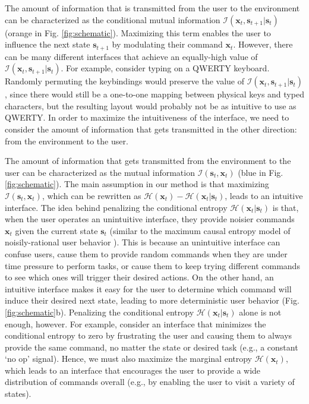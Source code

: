 \documentclass{article}
\newcommand{\bx}{\mathbf{x}}
\newcommand{\bs}{\mathbf{s}}
\newcommand{\mi}{\mathcal{I}}
\newcommand{\ent}{\mathcal{H}}
\begin{document}
The amount of information that is transmitted from the user to the environment can be characterized as the conditional mutual information $\mi(\bx_t, \bs_{t+1} | \bs_t)$ (orange in Fig. \ref{fig:schematic}).
Maximizing this term enables the user to influence the next state $\bs_{t+1}$ by modulating their command $\bx_t$.
However, there can be many different interfaces that achieve an equally-high value of $\mi(\bx_t, \bs_{t+1} | \bs_t)$.
For example, consider typing on a QWERTY keyboard.
Randomly permuting the keybindings would preserve the value of $\mi(\bx_t, \bs_{t+1} | \bs_t)$, since there would still be a one-to-one mapping between physical keys and typed characters, but the resulting layout would probably not be as intuitive to use as QWERTY.
In order to maximize the intuitiveness of the interface, we need to consider the amount of information that gets transmitted in the other direction: from the environment to the user.

The amount of information that gets transmitted from the environment to the user can be characterized as the mutual information $\mi(\bs_t, \bx_t)$ (blue in Fig. \ref{fig:schematic}). 
The main assumption in our method is that maximizing $\mi(\bs_t, \bx_t)$, which can be rewritten as $\ent(\bx_t) - \ent(\bx_t | \bs_t)$, leads to an intuitive interface.
The idea behind penalizing the conditional entropy $\ent(\bx_t | \bs_t)$ is that, when the user operates an unintuitive interface, they provide noisier commands $\bx_t$ given the current state $\bs_t$ (similar to the maximum causal entropy model of noisily-rational user behavior \cite{ziebart2010modeling}).
This is because an unintuitive interface can confuse users, cause them to provide random commands when they are under time pressure to perform tasks, or cause them to keep trying different commands to see which ones will trigger their desired actions.
On the other hand, an intuitive interface makes it easy for the user to determine which command will induce their desired next state, leading to more deterministic user behavior (Fig. \ref{fig:schematic}b).
Penalizing the conditional entropy $\ent(\bx_t | \bs_t)$ alone is not enough, however.
For example, consider an interface that minimizes the conditional entropy to zero by frustrating the user and causing them to always provide the same command, no matter the state or desired task (e.g., a constant `no op' signal).
Hence, we must also maximize the marginal entropy $\ent(\bx_t)$, which leads to an interface that encourages the user to provide a wide distribution of commands overall (e.g., by enabling the user to visit a variety of states).
\end{document}
